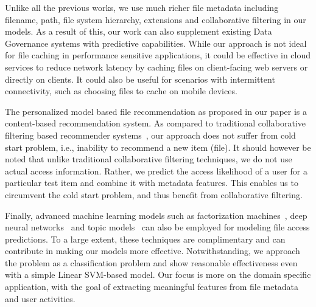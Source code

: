{Unlike all the previous works, we use much richer file metadata
including filename, path, file system hierarchy, extensions and
collaborative filtering in our models. As a result of this, our work
can also supplement existing Data Governance systems with predictive
capabilities. While our approach is not ideal for file caching in
performance sensitive applications, it could be effective in cloud
services to reduce network latency by caching files on client-facing
web servers or directly on clients.  It could also be useful for
scenarios with intermittent connectivity, such as choosing files to
cache on mobile devices.

The personalized model based file recommendation as proposed in our
paper is a content-based recommendation system. As compared to
traditional collaborative filtering based recommender
systems~\cite{linden2003amazon, breese1998empirical}, our approach
does not suffer from cold start problem, i.e., inability to recommend
a new item (file). It should however be noted that unlike traditional
collaborative filtering techniques, we do not use actual access
information. Rather, we predict the access likelihood of a user for a
particular test item and combine it with metadata features. This
enables us to circumvent the cold start problem, and thus benefit from
collaborative filtering.

Finally, advanced machine learning models such as factorization
machines~\cite{rendle2010factorization}, deep neural
networks~\cite{salakhutdinov2007restricted,hinton2006fast} and topic
models~\cite{nagori11-etncc, Ovsjanikov_topicmodeling} can also be
employed for modeling file access predictions.
To a large extent, these techniques are complimentary and can
contribute in making our models more effective.  Notwithstanding, we
approach the problem as a classification problem and show reasonable
effectiveness even with a simple Linear SVM-based model.  Our focus is
more on the domain specific application, with the goal of extracting
meaningful features from file metadata and user activities.

}
